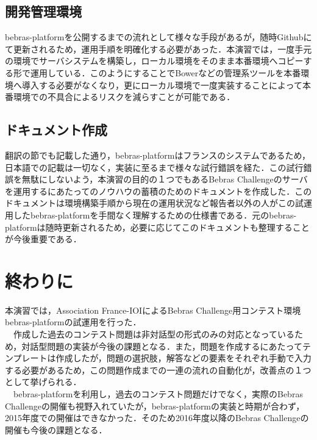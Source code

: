 \documentclass[a4paper]{jarticle}
\begin{document}
\begin{multicols}{2}
\subsection{開発管理環境}
bebras-platformを公開するまでの流れとして様々な手段があるが，随時Githubにて更新されるため，運用手順を明確化する必要があった．本演習では，一度手元の環境でサーバシステムを構築し，ローカル環境をそのまま本番環境へコピーする形で運用している．このようにすることでBowerなどの管理系ツールを本番環境へ導入する必要がなくなり，更にローカル環境で一度実装することによって本番環境での不具合によるリスクを減らすことが可能である．

\subsection{ドキュメント作成}
翻訳の節でも記載した通り，bebras-platformはフランスのシステムであるため，日本語での記載は一切なく，実装に至るまで様々な試行錯誤を経た．この試行錯誤を無駄にしないよう，本演習の目的の１つでもあるBebras Challengeのサーバを運用するにあたってのノウハウの蓄積のためのドキュメントを作成した．このドキュメントは環境構築手順から現在の運用状況など報告者以外の人がこの試運用したbebras-platformを手間なく理解するための仕様書である．元のbebras-platformは随時更新されるため，必要に応じてこのドキュメントも整理することが今後重要である．

\section{終わりに}
本演習では，Association France-IOIによるBebras Challenge用コンテスト環境bebras-platformの試運用を行った．
\\　作成した過去のコンテスト問題は非対話型の形式のみの対応となっているため，対話型問題の実装が今後の課題となる．また，問題を作成するにあたってテンプレートは作成したが，問題の選択肢，解答などの要素をそれぞれ手動で入力する必要があるため，この問題作成までの一連の流れの自動化が，改善点の１つとして挙げられる．
\\　bebras-platformを利用し，過去のコンテスト問題だけでなく，実際のBebras Challengeの開催も視野入れていたが，bebras-platformの実装と時期が合わず，2015年度での開催はできなかった．そのため2016年度以降のBebras Challengeの開催も今後の課題となる．

\end{multicols}
\end{document}
